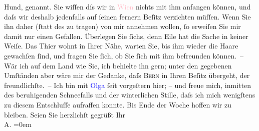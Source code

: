                Hund, \textsc{\label{K_L01265-1v}\label{K_L01265-1h}} genannt. Sie wiſſen dſs wir
               in \textcolor{pink}{Wien}{}\ledrightnote{\textcolor{pink}{Wien}} nichts mit ihm anfangen können, und daſs wir
               deshalb jedenfalls auf ſeinen fernern Beſitz verzichten {\pb}müſſen. Wenn Sie ihn daher (ſtatt des \label{K_L01265_1v}\label{K_L01265_1h} zu tragen) von mir annehmen wollen, ſo erweiſen Sie
               mir damit nur einen Gefallen. Überlegen Sie ſichs, denn Eile hat die Sache in keiner
               Weiſe. Das Thier wohnt in Ihrer Nähe, warten Sie, bis ihm wieder {\pb}die Haare gewachſen ſind, und fragen Sie ſich, ob Sie
               ſich mit ihm befreunden können. – Wär ich auf dem Land wie Sie, ich behielte ihn
               gern; unter den gegebenen Umſtänden aber wäre mir der Gedanke, daſs \textsc{Bern} in Ihren Beſitz übergeht, der freundlichſte. –\pend
           \pstart
           {\pb}Ich bin mit \textcolor{blue}{Olga}{}\ledrightnote{\textcolor{blue}{Olga Schnitzler}}
               ſeit vorgeſtern hier; – und freue mich, inmitten des beruhigenden Schneefalls und der
               winterlichen Stille, daſs ich mich wenigſtens zu diesem Entschluſſe aufraffen konnte.
               Bis Ende der Woche hoffen wir zu bleiben.\pend
           \pstart
           Seien Sie herzlichſt gegrüßt\pend
           \pstart
           Ihr{\\[\baselineskip]}\spacefill\mbox{A.}\pend
           \leftskip=0em{}\endnumbering{}  
      